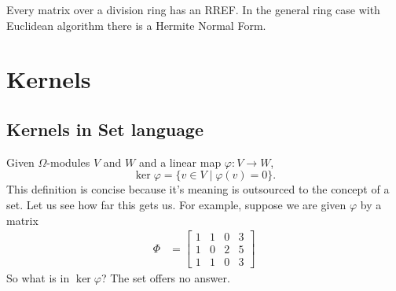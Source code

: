 \documentclass[12pt,twoside,dvipsnames,letterpaper]{memoir}
\begin{document}
\begin{proposition}
    Every matrix over a division ring has an RREF.
    In the general ring case with Euclidean algorithm 
    there is a Hermite Normal Form.
\end{proposition}



\section{Kernels}

\subsection{Kernels in Set language}
Given $\Omega$-modules $V$ and $W$ and a linear map $\varphi:V\to W$, 
\[
    \ker \varphi=\{v\in V\mid \varphi(v)=0\}.
\]
This definition is concise because it's meaning
is outsourced to the concept of a set. Let us see how 
far this gets us. 
For example, suppose we are given $\varphi$ by a matrix 
\begin{align*}
    \Phi & = 
    \begin{bmatrix}
        1 & 1 & 0 & 3\\
        1 & 0 & 2 & 5\\
        1 & 1 & 0 & 3
    \end{bmatrix}
\end{align*}
So what is in $\ker\varphi$?  The set 
offers no answer.

\end{document}
